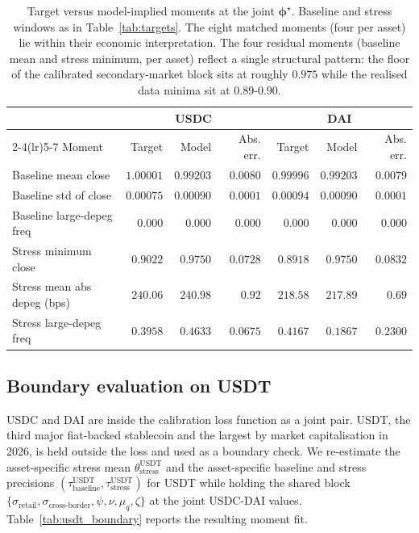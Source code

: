 \begin{table}[h]
\centering
\caption{Target versus model-implied moments at the joint $\boldsymbol{\phi}^\star$. Baseline and stress windows as in Table~\ref{tab:targets}. The eight matched moments (four per asset) lie within their economic interpretation. The four residual moments (baseline mean and stress minimum, per asset) reflect a single structural pattern: the floor of the calibrated secondary-market block sits at roughly $0.975$ while the realised data minima sit at $0.89$-$0.90$.}
\label{tab:moments_fit}
\begin{tabular}{lrrrrrr}
\toprule
& \multicolumn{3}{c}{USDC} & \multicolumn{3}{c}{DAI} \\
\cmidrule(lr){2-4}\cmidrule(lr){5-7}
Moment & Target & Model & Abs. err. & Target & Model & Abs. err. \\
\midrule
Baseline mean close & $1.00001$ & $0.99203$ & $0.0080$ & $0.99996$ & $0.99203$ & $0.0079$ \\
Baseline std of close & $0.00075$ & $0.00090$ & $0.0001$ & $0.00094$ & $0.00090$ & $0.0001$ \\
Baseline large-depeg freq & $0.000$ & $0.000$ & $0.000$ & $0.000$ & $0.000$ & $0.000$ \\
Stress minimum close & $0.9022$ & $0.9750$ & $0.0728$ & $0.8918$ & $0.9750$ & $0.0832$ \\
Stress mean abs depeg (bps) & $240.06$ & $240.98$ & $0.92$ & $218.58$ & $217.89$ & $0.69$ \\
Stress large-depeg freq & $0.3958$ & $0.4633$ & $0.0675$ & $0.4167$ & $0.1867$ & $0.2300$ \\
\bottomrule
\end{tabular}
\end{table}

\subsection{Boundary evaluation on USDT}\label{sub:oos}

USDC and DAI are inside the calibration loss function as a joint pair. USDT, the third major fiat-backed stablecoin and the largest by market capitalisation in 2026, is held outside the loss and used as a boundary check. We re-estimate the asset-specific stress mean $\theta_{\text{stress}}^{\text{USDT}}$ and the asset-specific baseline and stress precisions $(\tau_{\text{baseline}}^{\text{USDT}}, \tau_{\text{stress}}^{\text{USDT}})$ for USDT while holding the shared block $\{\sigma_{\text{retail}}, \sigma_{\text{cross-border}}, \psi, \nu, \mu_q, \zeta\}$ at the joint USDC-DAI values. Table~\ref{tab:usdt_boundary} reports the resulting moment fit.

